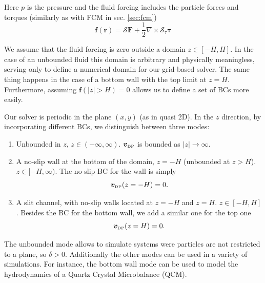 \documentclass[ twoside,openright,titlepage,numbers=noenddot,%
headinclude,footinclude,cleardoublepage=empty,abstract=on,
BCOR=5mm,paper=a4,fontsize=11pt, dvipsnames
]{scrreprt}
\renewcommand{\vec}[1]{\bm{#1}}
\newcommand{\oper}[1]{\mathcal{#1}}
\newcommand{\half}{\frac{1}{2}}
\newcommand{\fpos}{r}
\newcommand{\fvel}{v}
\newcommand{\dpr}{\text{\tiny DP}}
\begin{document}
Here $p$ is the pressure and the fluid forcing includes the particle forces and torques (similarly as with \gls{FCM} in sec. \ref{sec:fcm})
\begin{equation}
  \vec{f}(\vec{\fpos}) = \oper{S}\vec{F} + \half\nabla\times\oper{S}_{\tau}\vec{\tau}
\end{equation}

We assume that the fluid forcing is zero outside a domain $z\in [-H, H]$. In the case of an unbounded fluid this domain is arbitrary and physically meaningless, serving only to define a numerical domain for our grid-based solver. The same thing happens in the case of a bottom wall with the top limit at $z=H$. Furthermore, assuming $\vec{f}(|z|>H) = 0$ allows us to define a set of \glspl{BC} more easily.

Our solver is periodic in the plane $(x,y)$ (as in quasi 2D). In the $z$ direction, by incorporating different \glspl{BC}, we distinguish between three modes:
\begin{enumerate}
\item Unbounded in $z$, $z\in(-\infty, \infty)$. $\vec{\fvel}_{\dpr}$ is bounded as $|z|\rightarrow\infty$.
\item A no-slip  wall at the bottom of the domain, $z=-H$ (unbounded at $z>H$). $z\in [-H, \infty)$.
  The no-slip \gls{BC} for the wall is simply
  \begin{equation}
    \label{eq:dpstokesbwvelbc}
    \vec{\fvel}_{\dpr}(z=-H) = 0.   
  \end{equation} 
\item A slit channel, with no-slip walls located at $z=-H$ and $z=H$. $z\in [-H, H]$. Besides the \gls{BC} for the bottom wall, we add a similar one for the top one
  \begin{equation}
    \label{eq:dpstokestwvelbc}
    \vec{\fvel}_{\dpr}(z=H) = 0.
  \end{equation}
\end{enumerate}
The unbounded mode allows to simulate systems were particles are not restricted to a plane, so $\delta>0$. Additionally the other modes can be used in a variety of simulations. For instance, the bottom wall mode can be used to model the hydrodynamics of a Quartz Crystal Microbalance (QCM).
\end{document}
